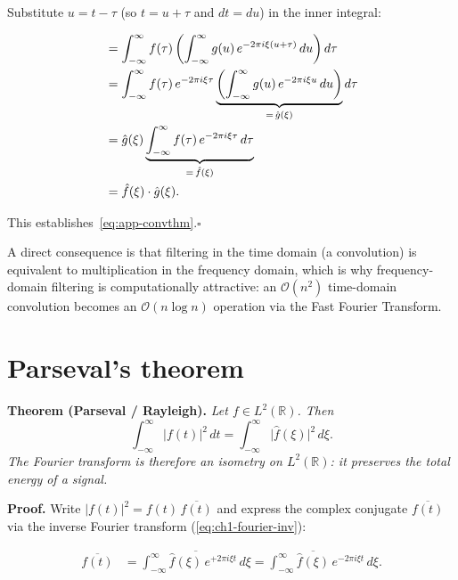 Substitute $u = t - \tau$ (so $t = u + \tau$ and $dt = du$) in the
inner integral:

\begin{align}
  &= \int_{-\infty}^{\infty} f(\tau)
       \left(
         \int_{-\infty}^{\infty} g(u)\,
         e^{-2\pi i\xi(u+\tau)}\,du
       \right) d\tau \notag \\
  &= \int_{-\infty}^{\infty} f(\tau)\,e^{-2\pi i\xi\tau}
       \underbrace{%
         \left(
           \int_{-\infty}^{\infty} g(u)\,
           e^{-2\pi i\xi u}\,du
         \right)%
       }_{=\,\hat{g}(\xi)}
     d\tau
     \label{eq:app-conv-factor} \\
  &= \hat{g}(\xi)
     \underbrace{%
       \int_{-\infty}^{\infty} f(\tau)\,
       e^{-2\pi i\xi\tau}\,d\tau%
     }_{=\,\hat{f}(\xi)}
     \notag \\
  &= \hat{f}(\xi)\cdot\hat{g}(\xi).
     \label{eq:app-conv-result}
\end{align}

This establishes~\eqref{eq:app-convthm}.\hfill$\square$

\bigskip

A direct consequence is that filtering in the time domain (a
convolution) is equivalent to multiplication in the frequency
domain, which is why frequency-domain filtering is computationally
attractive: an $\mathcal{O}(n^{2})$ time-domain convolution becomes
an $\mathcal{O}(n\log n)$ operation via the Fast Fourier Transform.

\section{Parseval's theorem}

\textbf{Theorem (Parseval / Rayleigh).}
\textit{Let $f \in L^{2}(\mathbb{R})$.
Then}
\begin{equation}
  \int_{-\infty}^{\infty} \lvert f(t) \rvert^{2}\,dt
  =
  \int_{-\infty}^{\infty} \lvert \hat{f}(\xi) \rvert^{2}\,d\xi.
  \label{eq:app-parseval}
\end{equation}
\textit{The Fourier transform is therefore an isometry on
$L^{2}(\mathbb{R})$: it preserves the total energy of a signal.}

\medskip
\textbf{Proof.}
Write $\lvert f(t)\rvert^{2} = f(t)\,\overline{f(t)}$ and express
the complex conjugate $\overline{f(t)}$ via the inverse Fourier
transform (\cref{eq:ch1-fourier-inv}):

\begin{align}
  \overline{f(t)}
    &= \overline{
         \int_{-\infty}^{\infty}
           \hat{f}(\xi)\,e^{+2\pi i\xi t}\,d\xi
       }
     = \int_{-\infty}^{\infty}
         \overline{\hat{f}(\xi)}\,
         e^{-2\pi i\xi t}\,d\xi.
     \label{eq:app-conj}
\end{align}


